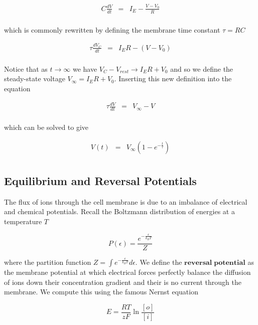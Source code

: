 \documentclass[a4paper,11pt]{book}
\begin{document}
\begin{eqnarray*}
C\frac{dV}{dt} &=& I_{E} - \frac{V - V_{0}}{R}\\
\end{eqnarray*}

which is commonly rewritten by defining the membrane time constant $\tau = RC$

\begin{eqnarray*}
\tau\frac{dV_{C}}{dt} &=& I_{E}R - (V - V_{0})\\
\end{eqnarray*}

Notice that as $t\rightarrow \infty$ we have $V_{C}-V_{rest} \rightarrow I_{E}R + V_{0}$ and so we define the steady-state voltage $V_{\infty} = I_{E}R + V_{0}$. Inserting this new definition into the equation

\begin{eqnarray*}
\tau\frac{dV}{dt} &=& V_{\infty} - V\\
\end{eqnarray*}

which can be solved to give

\begin{eqnarray*}
V(t) &=& V_{\infty}(1-e^{-\frac{t}{\tau}})\\
\end{eqnarray*}

\subsection{Equilibrium and Reversal Potentials}

The flux of ions through the cell membrane is due to an imbalance of electrical and chemical potentials. Recall the Boltzmann distribution of energies at a temperature $T$

\begin{equation*}
P(\epsilon) = \frac{e^{-\frac{\epsilon}{k_{B}T}}}{Z}
\end{equation*}

where the partition function $Z= \int e^{-\frac{\epsilon}{k_{B}T}}d\epsilon$. We define the $\mathbf{reversal\; potential}$ as the membrane potential at which electrical forces perfectly balance the diffusion of ions down their concentration gradient and their is no current through the membrane. We compute this using the famous Nernst equation

\begin{equation*}
E = \frac{RT}{zF}\ln \frac{[o]}{[i]}
\end{equation*}
\end{document}
